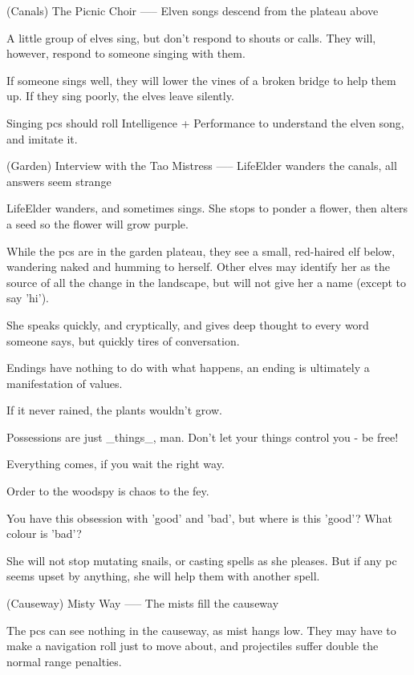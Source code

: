 (Canals) The Picnic Choir
-----
{Elven songs descend from the plateau above}

A little group of elves sing, but don't respond to shouts or calls.
They will, however, respond to someone singing with them.

If someone sings well, they will lower the vines of a broken bridge to help them up.
If they sing poorly, the elves leave silently.

Singing \glspl{pc} should roll Intelligence + Performance to understand the elven song, and imitate it.

(Garden) Interview with the Tao Mistress
-----
{LifeElder wanders the canals, all answers seem strange}

LifeElder wanders, and sometimes sings.
She stops to ponder a flower, then alters a seed so the flower will grow purple.

While the \glspl{pc} are in the garden plateau, they see a small, red-haired elf below, wandering naked and humming to herself.
Other elves may identify her as the source of all the change in the landscape, but will not give her a name (except to say 'hi').

She speaks quickly, and cryptically, and gives deep thought to every word someone says, but quickly tires of conversation.


\begin{speechtext}
  Endings have nothing to do with what happens, an ending is ultimately a manifestation of values.

  If it never rained, the plants wouldn't grow.

  Possessions are just _things_, man.  Don't let your things control you - be free!

  Everything comes, if you wait the right way.

  Order to the woodspy is chaos to the fey.

  You have this obsession with 'good' and 'bad', but where is this 'good'? What colour is 'bad'?

\end{speechtext}

She will not stop mutating snails, or casting spells as she pleases.
But if any \gls{pc} seems upset by anything, she will help them with another spell.

(Causeway) Misty Way
-----
{The mists fill the causeway}

The \glspl{pc} can see nothing in the causeway, as mist hangs low.
They may have to make a navigation roll just to move about, and projectiles suffer double the normal range penalties.

